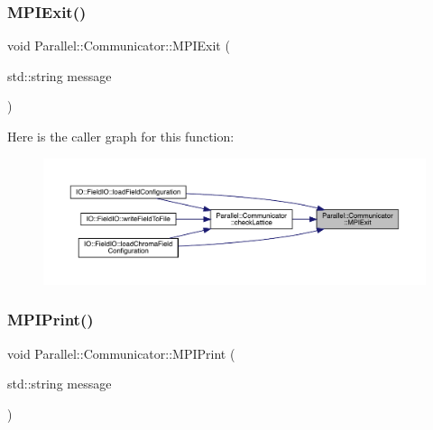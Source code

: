 \subsubsection{\texorpdfstring{MPIExit()}{MPIExit()}}
{\footnotesize\ttfamily void Parallel\+::\+Communicator\+::\+M\+P\+I\+Exit (\begin{DoxyParamCaption}\item[{std\+::string}]{message }\end{DoxyParamCaption})\hspace{0.3cm}{\ttfamily [static]}}

Here is the caller graph for this function\+:
\nopagebreak
\begin{figure}[H]
\begin{center}
\leavevmode
\includegraphics[width=350pt]{class_parallel_1_1_communicator_a6759125172843d9229c644f2a3a21ab7_icgraph}
\end{center}
\end{figure}
\mbox{\label{class_parallel_1_1_communicator_ab1b15401de819cf343398b767d6730ed}} 
\subsubsection{\texorpdfstring{MPIPrint()}{MPIPrint()}}
{\footnotesize\ttfamily void Parallel\+::\+Communicator\+::\+M\+P\+I\+Print (\begin{DoxyParamCaption}\item[{std\+::string}]{message }\end{DoxyParamCaption})\hspace{0.3cm}{\ttfamily [static]}}

\mbox{\label{class_parallel_1_1_communicator_a3da13427d693e0ce924159e871c83e19}} 
